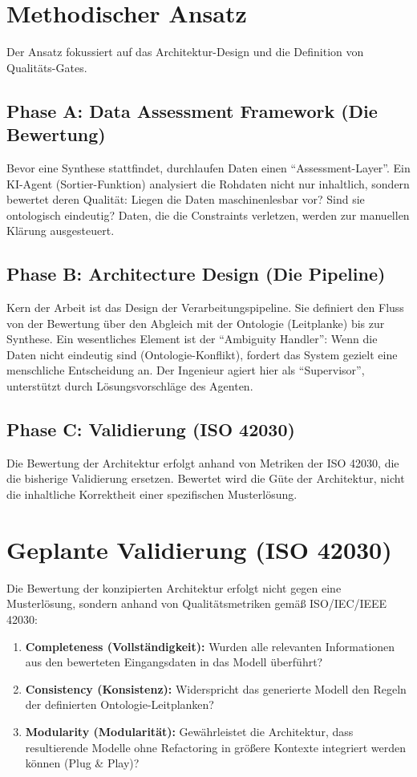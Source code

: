 \documentclass[12pt, a4paper]{article}
\begin{document}
\section{Methodischer Ansatz}

Der Ansatz fokussiert auf das Architektur-Design und die Definition von Qualitäts-Gates.

\subsection*{Phase A: Data Assessment Framework (Die Bewertung)}
Bevor eine Synthese stattfindet, durchlaufen Daten einen \enquote{Assessment-Layer}. Ein KI-Agent (Sortier-Funktion) analysiert die Rohdaten nicht nur inhaltlich, sondern bewertet deren Qualität: Liegen die Daten maschinenlesbar vor? Sind sie ontologisch eindeutig? Daten, die die Constraints verletzen, werden zur manuellen Klärung ausgesteuert.

\subsection*{Phase B: Architecture Design (Die Pipeline)}
Kern der Arbeit ist das Design der Verarbeitungspipeline. Sie definiert den Fluss von der Bewertung über den Abgleich mit der Ontologie (Leitplanke) bis zur Synthese. Ein wesentliches Element ist der \enquote{Ambiguity Handler}: Wenn die Daten nicht eindeutig sind (Ontologie-Konflikt), fordert das System gezielt eine menschliche Entscheidung an. Der Ingenieur agiert hier als \enquote{Supervisor}, unterstützt durch Lösungsvorschläge des Agenten.

\subsection*{Phase C: Validierung (ISO 42030)}
Die Bewertung der Architektur erfolgt anhand von Metriken der ISO 42030, die die bisherige Validierung ersetzen. Bewertet wird die Güte der Architektur, nicht die inhaltliche Korrektheit einer spezifischen Musterlösung.


\section{Geplante Validierung (ISO 42030)}

Die Bewertung der konzipierten Architektur erfolgt nicht gegen eine Musterlösung, sondern anhand von Qualitätsmetriken gemäß ISO/IEC/IEEE 42030:
\begin{enumerate}
    \item \textbf{Completeness (Vollständigkeit):} Wurden alle relevanten Informationen aus den bewerteten Eingangsdaten in das Modell überführt?
    \item \textbf{Consistency (Konsistenz):} Widerspricht das generierte Modell den Regeln der definierten Ontologie-Leitplanken?
    \item \textbf{Modularity (Modularität):} Gewährleistet die Architektur, dass resultierende Modelle ohne Refactoring in größere Kontexte integriert werden können (Plug \& Play)?
\end{enumerate}
\end{document}
